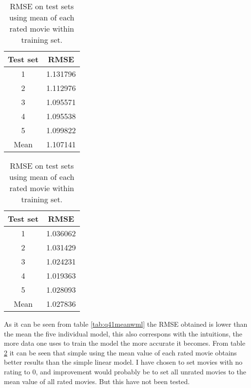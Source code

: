 \begin{table}[!htbp]
  \begin{minipage}[b]{0.5\linewidth}
    \centering
    \begin{tabular}{c|c}
      Test set & RMSE \\
      \hline
      1 & 1.131796 \\
      2 & 1.112976 \\
      3 & 1.095571 \\
      4 & 1.095538 \\
      5 & 1.099822 \\
      \hline
      Mean & 1.107141 \\
    \end{tabular}
    \caption{RMSE on test sets using the mean of the five $\mathbf{w}_{ML}$.}
    \label{tab:q41meanwml}
  \end{minipage}
  \hspace{0.5cm}
  \begin{minipage}[b]{0.5\linewidth}
    \centering
    \begin{tabular}{c|c}
      Test set & RMSE \\
      \hline
      1 & 1.036062 \\
      2 & 1.031429 \\
      3 & 1.024231 \\
      4 & 1.019363 \\
      5 & 1.028093 \\
      \hline
      Mean & 1.027836 \\
    \end{tabular}
    \caption{RMSE on test sets using mean of each rated movie within training set.}
    \label{tab:q41meanrated}
  \end{minipage}
\end{table}

As it can be seen from table \ref{tab:q41meanwml} the RMSE obtained is
lower than the mean the five individual model, this also correspons
with the intuitions, the more data one uses to train the model the
more accurate it becomes. From table \ref{tab:q41meanrated} it can be
seen that simple using the mean value of each rated movie obtains
better results than the simple linear model. I have chosen to set
movies with no rating to $0$, and improvement would probably be to set
all unrated movies to the mean value of all rated movies. But this
have not been tested.
